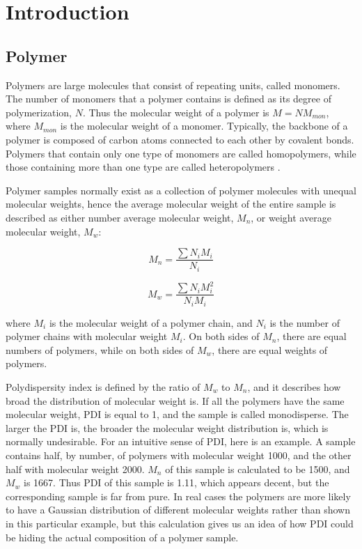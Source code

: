 \chapter{Introduction}
\graphicspath{{./introduction/graphs/}}

\onehalfspacing
\section{Polymer}

Polymers are large molecules that consist of repeating units, called monomers. The number of monomers that a polymer contains is defined as its degree of polymerization, $N$. Thus the molecular weight of a polymer is $M = NM_{mon}$, where $M_{mon}$ is the molecular weight of a monomer. Typically, the backbone of a polymer is composed of carbon atoms connected to each other by covalent bonds. Polymers that contain only one type of monomers are called homopolymers, while those containing more than one type are called heteropolymers \cite{Rubinstein2003}. 

Polymer samples normally exist as a collection of polymer molecules with unequal molecular weights, hence the average molecular weight of the entire sample is described as either number average molecular weight, $M_{n}$, or weight average molecular weight, $M_{w}$: 

\begin{equation}
\label{Mn}
M_{n} = \dfrac{\sum N_{i}M_{i}}{N_{i}}
\end{equation}

\begin{equation}
\label{Mw}
M_{w} = \dfrac{\sum N_{i}M_{i}^{2}}{N_{i}M_{i}}
\end{equation}

where $M_{i}$ is the molecular weight of a polymer chain, and $N_{i}$ is the number of polymer chains with molecular weight $M_{i}$. On both sides of $M_{n}$, there are equal numbers of polymers, while on both sides of $M_{w}$, there are equal weights of polymers. 

Polydispersity index is defined by the ratio of $M_{w}$ to $M_{n}$, and it describes how broad the distribution of molecular weight is. If all the polymers have the same molecular weight, PDI is equal to 1, and the sample is called monodisperse. The larger the PDI is, the broader the molecular weight distribution is, which is normally undesirable. For an intuitive sense of PDI, here is an example. A sample contains half, by number, of polymers with molecular weight 1000, and the other half with molecular weight 2000. $M_{n}$ of this sample is calculated to be 1500, and $M_{w}$ is 1667. Thus PDI of this sample is 1.11, which appears decent, but the corresponding sample is far from pure. In real cases the polymers are more likely to have a Gaussian distribution of different molecular weights rather than shown in this particular example, but this calculation gives us an idea of how PDI could be hiding the actual composition of a polymer sample.

